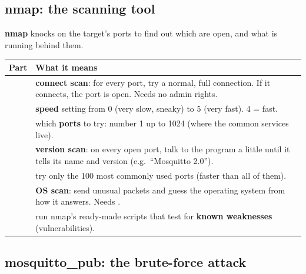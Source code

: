 \documentclass[11pt,a4paper]{article}
\begin{document}
\subsection{nmap: the scanning tool}

\textbf{nmap} knocks on the target's ports to find out which are open, and what is running behind them.

\begin{longtable}{P{3.6cm}P{11.4cm}}
\toprule
Part & What it means \\
\midrule
\endhead
{} & \textbf{connect scan}: for every port, try a normal, full connection. If it connects, the port is open.
Needs no admin rights. \\
 & \textbf{speed} setting from 0 (very slow, sneaky) to 5 (very fast). 4 = fast. \\
 & which \textbf{ports} to try: number 1 up to 1024 (where the common services live). \\
 & \textbf{version scan}: on every open port, talk to the program a little until it tells its name and
version (e.g.\ ``Mosquitto 2.0''). \\
 & try only the 100 most commonly used ports (faster than all of them). \\
 & \textbf{OS scan}: send unusual packets and guess the operating system from how it answers. Needs
. \\
 & run nmap's ready-made scripts that test for \textbf{known weaknesses}
(vulnerabilities). \\
\bottomrule
\end{longtable}

\subsection{mosquitto\_pub: the brute-force attack}

\end{document}
